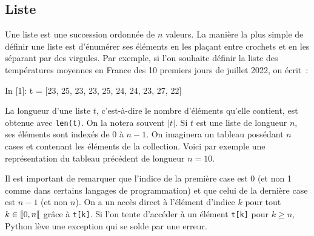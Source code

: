\documentclass{magnoliaold}
\begin{document}
\subsection{Liste}

Une liste est une succession ordonnée de $n$ valeurs. La manière la plus simple de définir une
liste est d'énumérer ses éléments en les plaçant entre crochets et en les séparant par des virgules.
Par exemple, si l'on souhaite définir la liste des températures moyennes en France des 10 premiers jours
de juillet 2022, on écrit~:

\begin{pythoncode}
In [1]: t = [23, 25, 23, 23, 25, 24, 24, 23, 27, 22]
\end{pythoncode}
\noindent
La longueur d'une liste $t$, c'est-à-dire le nombre d'éléments qu'elle contient,
est obtenue avec \verb!len(t)!. On la notera souvent $|t|$. Si $t$ est une liste de longueur
$n$, ses éléments sont indexés de 0 à $n-1$. On imaginera un tableau possédant $n$ cases
et contenant les éléments de la collection. Voici par exemple une représentation du tableau
précédent de longueur $n=10$.
\begin{center}
\end{center}
Il est important de remarquer que l'indice de la première case est 0 (et non 1 comme dans certains langages de programmation) et que celui de la
dernière case est $n-1$ (et non $n$). On a un accès direct à l'élément d'indice $k$ 
pour tout $k\in\left\llbracket 0,n\right\llbracket$ grâce à \verb!t[k]!. Si l'on tente d'accéder à un élément \verb!t[k]! pour $k\geq n$,
Python lève une exception qui se solde par une erreur.\\
\end{document}

